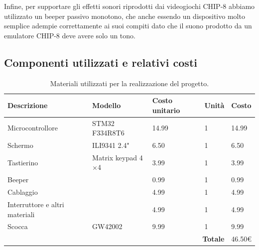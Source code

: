 \documentclass[a4paper]{article}
\begin{document}
Infine, per supportare gli effetti sonori riprodotti dai videogiochi CHIP-8 abbiamo
utilizzato un beeper passivo monotono, che anche essendo un dispositivo molto semplice
adempie correttamente ai suoi compiti dato che il suono prodotto da un emulatore CHIP-8
deve avere solo un tono.

\subsection{Componenti utilizzati e relativi costi}

\begin{table}[h!t] %
    \centering
    \begin{tabular}{|llll|l|}
        \hline
        \multicolumn{1}{|l|}{\textbf{Descrizione}}          & \multicolumn{1}{l|}{\textbf{Modello}}       & \multicolumn{1}{l|}{\textbf{Costo unitario}} & \textbf{Unità} & \textbf{Costo} \\ \hline
        \multicolumn{1}{|l|}{Microcontrollore}       & \multicolumn{1}{l|}{STM32 F334R8T6}         & \multicolumn{1}{l|}{14.99}                   & 1               & 14.99          \\ \hline
        \multicolumn{1}{|l|}{Schermo}                & \multicolumn{1}{l|}{ILI9341 2.4"}           & \multicolumn{1}{l|}{6.50}                    & 1               & 6.50           \\ \hline
        \multicolumn{1}{|l|}{Tastierino}          & \multicolumn{1}{l|}{Matrix keypad 4$\times$4} & \multicolumn{1}{l|}{3.99}                    & 1               & 3.99           \\ \hline
        \multicolumn{1}{|l|}{Beeper}                 & \multicolumn{1}{l|}{}                       & \multicolumn{1}{l|}{0.99}                    & 1               & 0.99           \\ \hline
        \multicolumn{1}{|l|}{Cablaggio} & \multicolumn{1}{l|}{}                       & \multicolumn{1}{l|}{4.99}                    & 1               & 4.99           \\ \hline
        \multicolumn{1}{|l|}{Interruttore e altri materiali} & \multicolumn{1}{l|}{}       & \multicolumn{1}{l|}{4.99}                    & 1               & 4.99           \\ \hline
        \multicolumn{1}{|l|}{Scocca} & \multicolumn{1}{l|}{GW42002}                       & \multicolumn{1}{l|}{9.99}                    & 1               & 9.99           \\ \hline
        \multicolumn{4}{|r|}{\textbf{Totale}}                                                      & 46.50\euro    \\ \hline
    \end{tabular}
    \caption{
        Materiali utilizzati per la realizzazione del progetto.
    }
    \label{tab:components}
\end{table}
\end{document}
